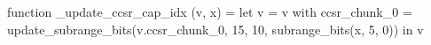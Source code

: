 function _update_ccsr_cap_idx (v, x) = let v = { v with ccsr_chunk_0 = update_subrange_bits(v.ccsr_chunk_0, 15, 10, subrange_bits(x, 5, 0)) } in
  v
